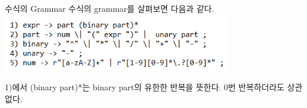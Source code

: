 \documentclass{beamer}
\begin{document}


 




\begin{frame}{수식의 Grammar} 
수식의 grammar를 살펴보면 다음과 같다. \\
\includegraphics[width=10cm,keepaspectratio]{grammar}

1)에서 (binary part)*는 binary part의 유한한 반복을 뜻한다. 0번 반복하더라도 상관없다. 

\end{frame}
\end{document}
